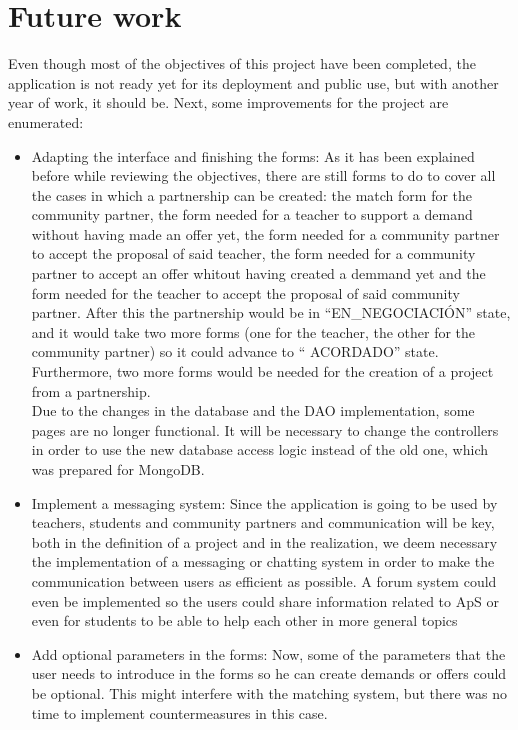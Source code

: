 \documentclass[11pt]{book}
\begin{document}
	\section{Future work}
	Even though most of the objectives of this project have been completed, the application is not ready yet for its deployment and public use, but with another year of work, it should be. Next, some improvements for the project are enumerated:
	\begin{itemize}
		\item Adapting the interface and finishing the forms: As it has been explained before while reviewing the objectives, there are still forms to do to cover all the cases in which a partnership can be created: the match form for the community partner, the form needed for a teacher to support a demand without having made an offer yet, the form needed for a community partner to accept the proposal of said teacher, the form needed for a community partner to accept an offer whitout having created a demmand yet and the form needed for the teacher to accept the proposal of said community partner. After this the partnership would be in ``EN\_NEGOCIACIÓN'' state, and it would take two more forms (one for the teacher, the other for the community partner) so it could advance to `` ACORDADO'' state. Furthermore, two more forms would be needed for the creation of a project from a partnership.\\
		Due to the changes in the database and the DAO implementation, some pages are no longer functional. It will be necessary to change the controllers in order to use the new database access logic instead of the old one, which was prepared for MongoDB.
		\item Implement a messaging system: Since the application is going to be used by teachers, students and community partners and communication will be key, both in the definition of a project and in the realization, we deem necessary the implementation of a messaging or chatting system in order to make the communication between users as efficient as possible. A forum system could even be implemented so the users could share information related to ApS or even for students to be able to help each other in more general topics
		\item Add optional parameters in the forms: Now, some of the parameters that the user needs to introduce in the forms so he can create demands or offers could be optional. This might interfere with the matching system, but there was no time to implement countermeasures in this case. \\

\end{itemize}
\end{document}
